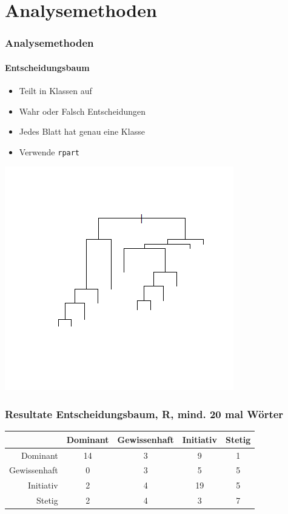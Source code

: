 \documentclass{beamer}
\begin{document}
 \section{Analysemethoden}
\begin{frame}
\frametitle{Analysemethoden}
\framesubtitle{Entscheidungsbaum}
\begin{itemize}\setlength\parskip{12pt}
\item Teilt in Klassen auf
\item Wahr oder Falsch Entscheidungen
\item Jedes Blatt hat genau eine Klasse
\item Verwende \texttt{rpart}
\end{itemize}
\begin{center}
	\includegraphics[scale=0.5]{RPart.png}
\end{center}
\end{frame}
\begin{frame}
\frametitle{Resultate Entscheidungsbaum, R, mind. 20 mal Wörter}
\begin{center}
\begin{tabular}{r|c|c|c|c|}
 &  Dominant  & Gewissenhaft & Initiativ & Stetig\\
\hline
Dominant & 14 & 3 & 9 & 1 \\
Gewissenhaft & 0 & 3 & 5 & 5\\
Initiativ & 2 & 4 & 19 & 5\\
Stetig & 2 & 4 & 3 & 7
\end{tabular}
\end{center}
\end{frame}
\end{document}
